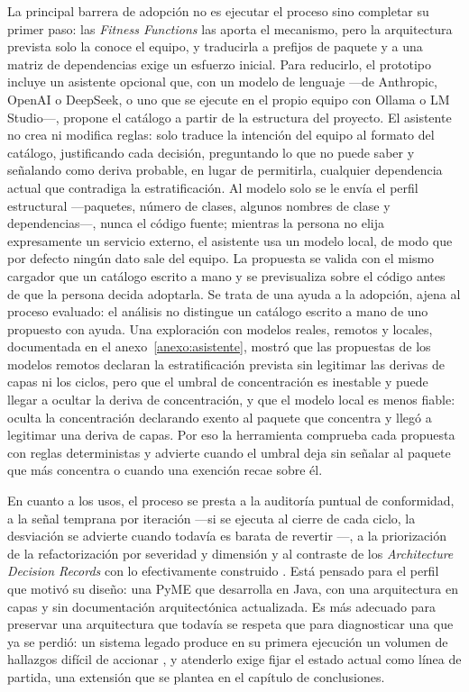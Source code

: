 La principal barrera de adopción no es ejecutar el proceso sino completar su primer paso: las \textit{Fitness Functions} las aporta el mecanismo, pero la arquitectura prevista solo la conoce el equipo, y traducirla a prefijos de paquete y a una matriz de dependencias exige un esfuerzo inicial. Para reducirlo, el prototipo incluye un asistente opcional que, con un modelo de lenguaje ---de Anthropic, OpenAI o DeepSeek, o uno que se ejecute en el propio equipo con Ollama o LM Studio---, propone el catálogo a partir de la estructura del proyecto. El asistente no crea ni modifica reglas: solo traduce la intención del equipo al formato del catálogo, justificando cada decisión, preguntando lo que no puede saber y señalando como deriva probable, en lugar de permitirla, cualquier dependencia actual que contradiga la estratificación. Al modelo solo se le envía el perfil estructural ---paquetes, número de clases, algunos nombres de clase y dependencias---, nunca el código fuente; mientras la persona no elija expresamente un servicio externo, el asistente usa un modelo local, de modo que por defecto ningún dato sale del equipo. La propuesta se valida con el mismo cargador que un catálogo escrito a mano y se previsualiza sobre el código antes de que la persona decida adoptarla. Se trata de una ayuda a la adopción, ajena al proceso evaluado: el análisis no distingue un catálogo escrito a mano de uno propuesto con ayuda. Una exploración con modelos reales, remotos y locales, documentada en el anexo~\ref{anexo:asistente}, mostró que las propuestas de los modelos remotos declaran la estratificación prevista sin legitimar las derivas de capas ni los ciclos, pero que el umbral de concentración es inestable y puede llegar a ocultar la deriva de concentración, y que el modelo local es menos fiable: oculta la concentración declarando exento al paquete que concentra y llegó a legitimar una deriva de capas. Por eso la herramienta comprueba cada propuesta con reglas deterministas y advierte cuando el umbral deja sin señalar al paquete que más concentra o cuando una exención recae sobre él.

En cuanto a los usos, el proceso se presta a la auditoría puntual de conformidad, a la señal temprana por iteración ---si se ejecuta al cierre de cada ciclo, la desviación se advierte cuando todavía es barata de revertir \citep{Klein2022}---, a la priorización de la refactorización por severidad y dimensión \citep{Hamed2023} y al contraste de los \textit{Architecture Decision Records} con lo efectivamente construido \citep{ADR}. Está pensado para el perfil que motivó su diseño: una PyME que desarrolla en Java, con una arquitectura en capas y sin documentación arquitectónica actualizada. Es más adecuado para preservar una arquitectura que todavía se respeta que para diagnosticar una que ya se perdió: un sistema legado produce en su primera ejecución un volumen de hallazgos difícil de accionar \citep{Anthony2024}, y atenderlo exige fijar el estado actual como línea de partida, una extensión que se plantea en el capítulo de conclusiones.

